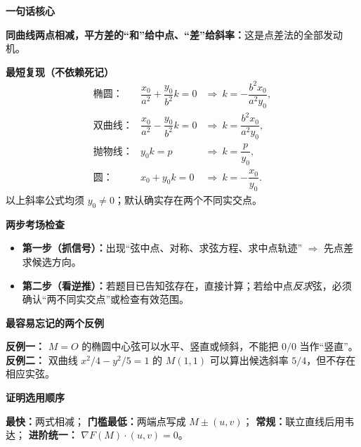 \begin{summarybox}
\textbf{\textcolor{CSummary}{一句话核心}}

\textbf{同曲线两点相减，平方差的“和”给中点、“差”给斜率：}这是点差法的全部发动机。

\medskip
\textbf{\textcolor{CSummary}{最短复现（不依赖死记）}}
\[
\begin{array}{rcl}
\text{椭圆：}&\dfrac{x_0}{a^2}+\dfrac{y_0}{b^2}k=0
&\Longrightarrow\ k=-\dfrac{b^2x_0}{a^2y_0},\\[6pt]
\text{双曲线：}&\dfrac{x_0}{a^2}-\dfrac{y_0}{b^2}k=0
&\Longrightarrow\ k=\dfrac{b^2x_0}{a^2y_0},\\[6pt]
\text{抛物线：}&y_0k=p
&\Longrightarrow\ k=\dfrac{p}{y_0},\\[6pt]
\text{圆：}&x_0+y_0k=0
&\Longrightarrow\ k=-\dfrac{x_0}{y_0}.
\end{array}
\]
以上斜率公式均须 $y_0\ne0$；默认确实存在两个不同实交点。

\medskip
\textbf{\textcolor{CSummary}{两步考场检查}}
\begin{itemize}[leftmargin=*,itemsep=0.4em,topsep=0.3em]
\item \textbf{第一步（抓信号）：}出现“弦中点、对称、求弦方程、求中点轨迹” $\Rightarrow$ 先点差求候选方向。
\item \textbf{第二步（看逆推）：}若题目已告知弦存在，直接计算；若给中点\emph{反求}弦，必须确认“两不同实交点”或检查有效范围。
\end{itemize}

\medskip
\textbf{\textcolor{CSummary}{最容易忘记的两个反例}}

\textbf{反例一：} $M=O$ 的椭圆中心弦可以水平、竖直或倾斜，不能把 $0/0$ 当作“竖直”。
\textbf{反例二：} 双曲线 $x^2/4-y^2/5=1$ 的 $M(1,1)$ 可以算出候选斜率 $5/4$，但不存在相应实弦。

\medskip
\textbf{\textcolor{CSummary}{证明选用顺序}}

\textbf{最快：}两式相减；\quad
\textbf{门槛最低：}两端点写成 $M\pm(u,v)$；\quad
\textbf{常规：}联立直线后用韦达；\quad
\textbf{进阶统一：} $\nabla F(M)\cdot(u,v)=0$。
\end{summarybox}
